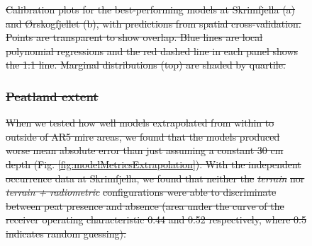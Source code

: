 \documentclass[soil, manuscript]{copernicus}
\providecommand{\DIFdel}[1]{{\protect\color{red}\sout{#1}}}                      %
\providecommand{\DIFdelFL}[1]{\DIFdel{#1}} %
\providecommand{\DIFdelbeginFL}{} %
\begin{document}
\begin{figure}
\DIFdelbeginFL %
{%
\DIFdelFL{Calibration plots for the best-performing models at Skrimfjella (a) and Ørskogfjellet (b), with predictions from spatial cross-validation. Points are transparent to show overlap. Blue lines are local polynomial regressions and the red dashed line in each panel shows the 1:1 line. Marginal distributions (top) are shaded by quartile.}}

\subsubsection{\DIFdel{Peatland extent}}
\addtocounter{subsubsection}{-1}%

\DIFdel{When we tested how well models extrapolated from within to outside of AR5 mire areas, we found that the models produced worse mean absolute error than just assuming a constant 30 cm depth (Fig. \ref{fig:modelMetricsExtrapolation}).
With the independent occurrence data at Skrimfjella, we found that neither the }\emph{\DIFdel{terrain}} %
\DIFdel{nor }\emph{\DIFdel{terrain + radiometric}} %
\DIFdel{configurations were able to discriminate between peat presence and absence (area under the curve of the receiver operating characteristic 0.44 and 0.52 respectively, where 0.5 indicates random guessing).
}%


\end{figure}
\end{document}
